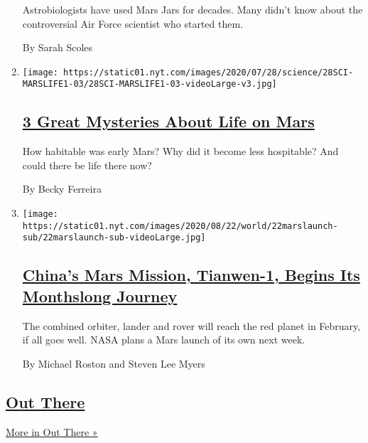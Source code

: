 \begin{enumerate}
  Astrobiologists have used Mars Jars for decades. Many didn't know
  about the controversial Air Force scientist who started them.

  By Sarah Scoles
\item
  \texttt{[image: https://static01.nyt.com/images/2020/07/28/science/28SCI-MARSLIFE1-03/28SCI-MARSLIFE1-03-videoLarge-v3.jpg]}

  \hypertarget{3-great-mysteries-about-life-on-mars}{%
  \subsection{\texorpdfstring{\href{/2020/07/24/science/mars-life-water.html}{3
  Great Mysteries About Life on
  Mars}}{3 Great Mysteries About Life on Mars}}\label{3-great-mysteries-about-life-on-mars}}

  How habitable was early Mars? Why did it become less hospitable? And
  could there be life there now?

  By Becky Ferreira
\item
  \texttt{[image: https://static01.nyt.com/images/2020/08/22/world/22marslaunch-sub/22marslaunch-sub-videoLarge.jpg]}

  \hypertarget{chinas-mars-mission-tianwen-1-begins-its-monthslong-journey}{%
  \subsection{\texorpdfstring{\href{/2020/07/22/science/mars-china-launch.html}{China's
  Mars Mission, Tianwen-1, Begins Its Monthslong
  Journey}}{China's Mars Mission, Tianwen-1, Begins Its Monthslong Journey}}\label{chinas-mars-mission-tianwen-1-begins-its-monthslong-journey}}

  The combined orbiter, lander and rover will reach the red planet in
  February, if all goes well. NASA plans a Mars launch of its own next
  week.

  By Michael Roston and Steven Lee Myers
\end{enumerate}

\hypertarget{out-there-2}{%
\subsection{\texorpdfstring{\href{/column/out-there}{Out
There}}{Out There}}\label{out-there-2}}

\href{/column/out-there}{More in Out There »}

